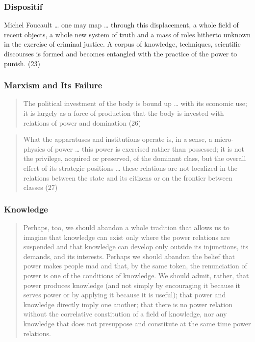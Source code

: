 \documentclass[xcolor=dvipsnames]{beamer}
\begin{document}
\begin{frame}
  \frametitle{Dispositif}
  \begin{block}{Michel Foucault}
    {\ldots} one may map {\ldots} through this displacement, a whole
    field of recent objects, a whole new system of truth and a mass of
    roles hitherto unknown in the exercise of criminal justice. A
    corpus of knowledge, techniques, scientific discourses is formed
    and becomes entangled with the practice of the power to punish.
    (23)
  \end{block}
\end{frame}

\begin{frame}
  \frametitle{Marxism and Its Failure}
  \begin{quote}
    The political investment of the body is bound up {\ldots} with its
    economic use; it is largely as a force of production that the body
    is invested with relations of power and domination (26)
  \end{quote}
  \begin{quote}
    What the apparatuses and institutions operate is, in a sense, a
    micro-physics of power {\ldots} this power is exercised rather
    than possessed; it is not the privilege, acquired or preserved, of
    the dominant class, but the overall effect of its strategic
    positions {\ldots} these relations are not localized in the
    relations between the state and its citizens or on the frontier
    between classes (27)
  \end{quote}
\end{frame}

\begin{frame}
  \frametitle{Knowledge}
  \begin{quote}
    Perhaps, too, we should abandon a whole tradition that allows us
    to imagine that knowledge can exist only where the power relations
    are suspended and that knowledge can develop only outside its
    injunctions, its demands, and its interests. Perhaps we should
    abandon the belief that power makes people mad and that, by the
    same token, the renunciation of power is one of the conditions of
    knowledge. We should admit, rather, that power produces knowledge
    (and not simply by encouraging it because it serves power or by
    applying it because it is useful); that power and knowledge
    directly imply one another; that there is no power relation
    without the correlative constitution of a field of knowledge, nor
    any knowledge that does not presuppose and constitute at the same
    time power relations. 
  \end{quote}
\end{frame}
\end{document}
